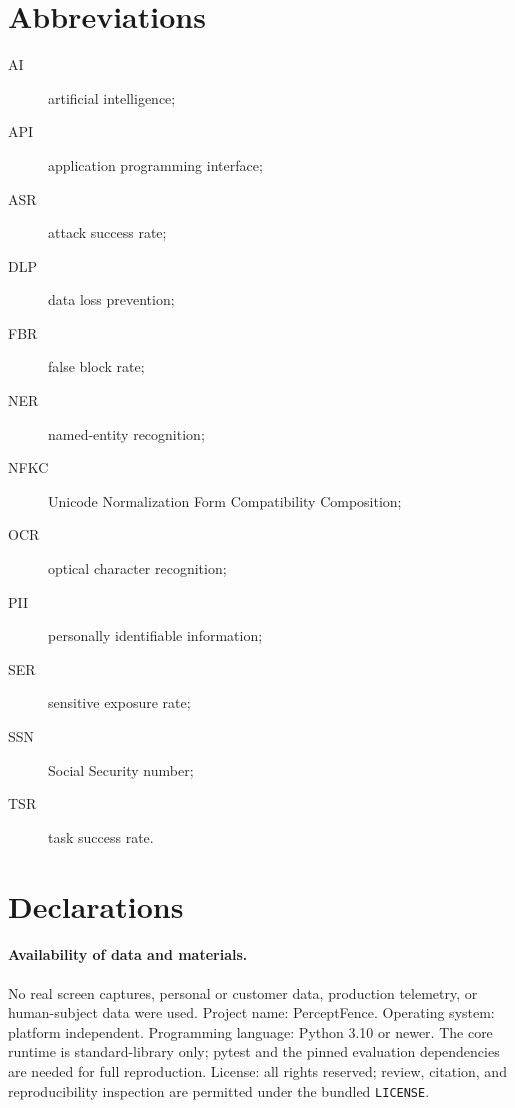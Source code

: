 \documentclass[pdflatex,sn-mathphys-num]{sn-jnl}
\newif\ifblind
\begin{document}
\section*{Abbreviations}

\begin{description}
  \item[AI] artificial intelligence;
  \item[API] application programming interface;
  \item[ASR] attack success rate;
  \item[DLP] data loss prevention;
  \item[FBR] false block rate;
  \item[NER] named-entity recognition;
  \item[NFKC] Unicode Normalization Form Compatibility Composition;
  \item[OCR] optical character recognition;
  \item[PII] personally identifiable information;
  \item[SER] sensitive exposure rate;
  \item[SSN] Social Security number;
  \item[TSR] task success rate.
\end{description}

\section*{Declarations}

\paragraph{Availability of data and materials.}
\ifblind
The blinded source code, synthetic fixtures, evaluator annotations,
machine-readable result CSVs, protocol, figure generators, tests, dependency
pins, and artifact checklist are provided in Additional file~1. We deliberately
do not link a public repository during double-anonymous review; an archival
record will be supplied after acceptance.
\else
\publicartifactavailability
\fi
No real screen captures, personal or customer data, production telemetry, or
human-subject data were used. Project name: PerceptFence. Operating system:
platform independent. Programming language: Python 3.10 or newer. The core
runtime is standard-library only; pytest and the pinned evaluation dependencies
are needed for full reproduction. License: all rights reserved; review,
citation, and reproducibility inspection are permitted under the bundled
\texttt{LICENSE}.
\end{document}
